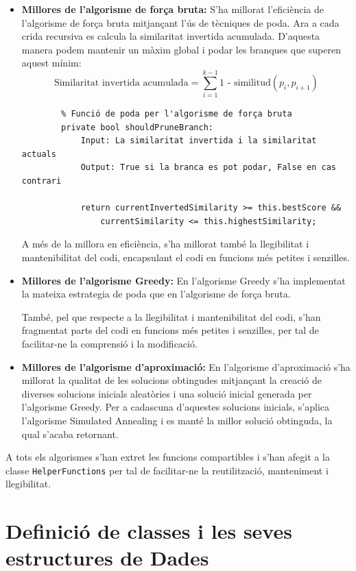 \documentclass[a4paper,12pt]{report}
\begin{document}
\begin{itemize}
	\item \textbf{Millores de l'algorisme de força bruta:} 
		S'ha millorat l'eficiència de l'algorisme de força bruta mitjançant l'ús de tècniques de poda. Ara a cada crida recursiva es calcula la similaritat invertida acumulada. D'aquesta manera podem mantenir un màxim global i podar les branques que superen aquest mínim:
		\[
			\text{Similaritat invertida acumulada} = \sum_{i=1}^{k-1} \text{1 - similitud}(p_i, p_{i+1})
		\]
		
		\begin{verbatim}
		% Funció de poda per l'algorisme de força bruta
		private bool shouldPruneBranch:
			Input: La similaritat invertida i la similaritat actuals
			Output: True si la branca es pot podar, False en cas contrari

			return currentInvertedSimilarity >= this.bestScore && 
				currentSimilarity <= this.highestSimilarity;
		\end{verbatim}

		A més de la millora en eficiència, s'ha millorat també la llegibilitat i mantenibilitat del codi, encapsulant el codi en funcions més petites i senzilles.
	
	\item \textbf{Millores de l'algorisme Greedy:}
		En l'algorisme Greedy s'ha implementat la mateixa estrategia de poda que en l'algorisme de força bruta. 

		També, pel que respecte a la llegibilitat i mantenibilitat del codi, s'han fragmentat parts del codi en funcions més petites i senzilles, per tal de facilitar-ne la comprensió i la modificació.
		
	\item \textbf{Millores de l'algorisme d'aproximació:}
		En l'algorisme d'aproximació s'ha millorat la qualitat de les solucions obtingudes mitjançant la creació de diverses solucions inicials aleatòries i una solució inicial generada per l'algorisme Greedy. 
		Per a cadascuna d'aquestes solucions inicials, s'aplica l'algorisme Simulated Annealing i es manté la millor solució obtinguda, la qual s'acaba retornant.
\end{itemize}

A tots els algorismes s'han extret les funcions compartibles i s'han afegit a la classe \texttt{HelperFunctions} per tal de facilitar-ne la reutilització, manteniment i llegibilitat.

\newpage

\chapter{Definició de classes i les seves estructures de Dades}
\end{document}
